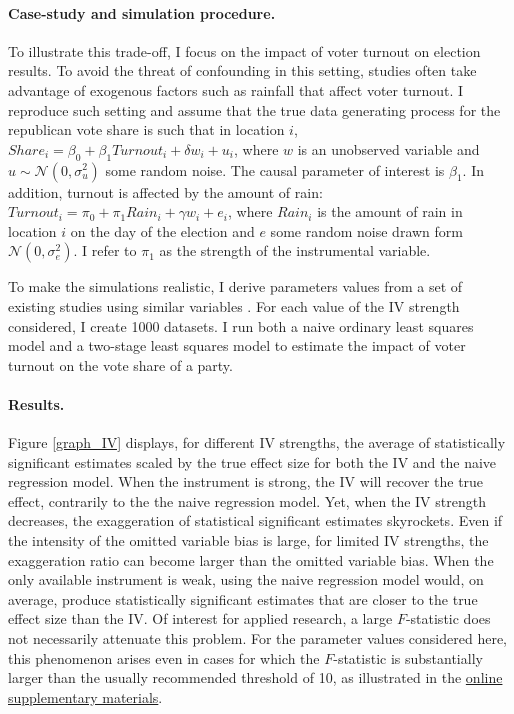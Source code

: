 \documentclass[usletter, 12pt]{article}
\begin{document}
        			\paragraph{Case-study and simulation procedure.} 
        			To illustrate this trade-off, I focus on the impact of voter turnout on election results. To avoid the threat of confounding in this setting, studies often take advantage of exogenous factors such as rainfall that affect voter turnout. I reproduce such setting and assume that the true data generating process for the republican vote share is such that  in location $i$, $Share_{i} = \beta_{0} + \beta_{1} Turnout_{i} + \delta w_{i} + u_{i}$, where $w$ is an unobserved variable and $u \sim \mathcal{N}(0, \sigma_{u}^{2})$ some random noise. The causal parameter of interest is $\beta_{1}$. In addition, turnout is affected by the amount of rain: $Turnout_{i} = \pi_{0} + \pi_{1} Rain_{i} + \gamma w_{i} + e_{i}$, where $Rain_{i}$ is the amount of rain in location $i$ on the day of the election 
			and $e$ some random noise drawn form $\mathcal{N}(0, \sigma_{e}^{2})$. I refer to $\pi_{1}$ as the strength of the instrumental variable. 
        			
        			To make the simulations realistic, I derive parameters values from a set of existing studies using similar variables \citep{gomez_republicans_2007, fujiwara_habit_2016, cooperman_randomization_2017}. For each value of the IV strength considered, I create 1000 datasets. I run both a naive ordinary least squares model and a two-stage least squares model to estimate the impact of voter turnout on the vote share of a party.
        			
        			\paragraph{Results.} 
			Figure \ref{graph_IV} displays, for different IV strengths, the average of statistically significant estimates scaled by the true effect size for both the IV and the naive regression model. When the instrument is strong, the IV will recover the true effect, contrarily to the the naive regression model. Yet, when the IV strength decreases, the exaggeration of statistical significant estimates skyrockets. Even if the intensity of the omitted variable bias is large, for limited IV strengths, the exaggeration ratio can become larger than the omitted variable bias. When the only available instrument is weak, using the naive regression model would, on average, produce statistically significant estimates that are closer to the true effect size than the IV. Of interest for applied research, a large $F$-statistic does not necessarily attenuate this problem. For the parameter values considered here, this phenomenon arises even in cases for which the $F$-statistic is substantially larger than the usually recommended threshold of 10, as illustrated in the \href{https://vincentbagilet.github.io/causal_inflation/IV.html#f-statistic-analysis}{online supplementary materials}. 
        		
\end{document}
